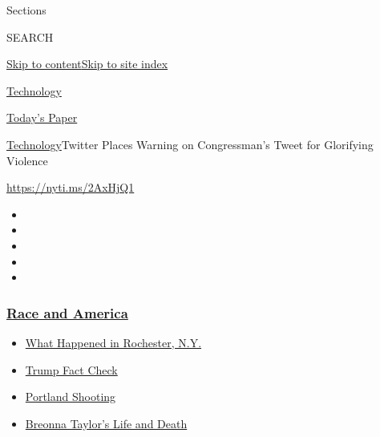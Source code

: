 Sections

SEARCH

\protect\hyperlink{site-content}{Skip to
content}\protect\hyperlink{site-index}{Skip to site index}

\href{https://www.nytimes3xbfgragh.onion/section/technology}{Technology}

\href{https://myaccount.nytimes3xbfgragh.onion/auth/login?response_type=cookie\&client_id=vi}{}

\href{https://www.nytimes3xbfgragh.onion/section/todayspaper}{Today's
Paper}

\href{/section/technology}{Technology}\textbar{}Twitter Places Warning
on Congressman's Tweet for Glorifying Violence

\url{https://nyti.ms/2AxHjQ1}

\begin{itemize}
\item
\item
\item
\item
\item
\end{itemize}

\hypertarget{race-and-america}{%
\subsubsection{\texorpdfstring{\href{https://www.nytimes3xbfgragh.onion/news-event/george-floyd-protests-minneapolis-new-york-los-angeles?name=styln-george-floyd\&region=TOP_BANNER\&block=storyline_menu_recirc\&action=click\&pgtype=Article\&impression_id=cc3ccf30-f2ae-11ea-8292-9134a9f2d48e\&variant=undefined}{Race
and America}}{Race and America}}\label{race-and-america}}

\begin{itemize}
\tightlist
\item
  \href{https://www.nytimes3xbfgragh.onion/2020/09/04/nyregion/rochester-police-daniel-prude.html?name=styln-george-floyd\&region=TOP_BANNER\&block=storyline_menu_recirc\&action=click\&pgtype=Article\&impression_id=cc3ccf31-f2ae-11ea-8292-9134a9f2d48e\&variant=undefined}{What
  Happened in Rochester, N.Y.}
\item
  \href{https://www.nytimes3xbfgragh.onion/2020/09/01/us/politics/trump-fact-check-protests.html?name=styln-george-floyd\&region=TOP_BANNER\&block=storyline_menu_recirc\&action=click\&pgtype=Article\&impression_id=cc3ccf32-f2ae-11ea-8292-9134a9f2d48e\&variant=undefined}{Trump
  Fact Check}
\item
  \href{https://www.nytimes3xbfgragh.onion/2020/08/30/us/portland-shooting-explained.html?name=styln-george-floyd\&region=TOP_BANNER\&block=storyline_menu_recirc\&action=click\&pgtype=Article\&impression_id=cc3cf640-f2ae-11ea-8292-9134a9f2d48e\&variant=undefined}{Portland
  Shooting}
\item
  \href{https://www.nytimes3xbfgragh.onion/2020/08/30/us/breonna-taylor-police-killing.html?name=styln-george-floyd\&region=TOP_BANNER\&block=storyline_menu_recirc\&action=click\&pgtype=Article\&impression_id=cc3cf641-f2ae-11ea-8292-9134a9f2d48e\&variant=undefined}{Breonna
  Taylor's Life and Death}
\end{itemize}

